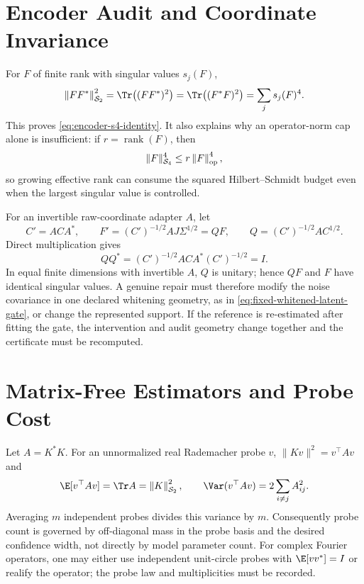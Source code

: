 \section{Encoder Audit and Coordinate Invariance}
\label{app:encoder-audit}

For $F$ of finite rank with singular values $s_j(F)$,
\begin{equation}
  \hsnorm{FF^\ast}^{2}
  =\Tr\bigl((FF^\ast)^2\bigr)
  =\Tr\bigl((F^\ast F)^2\bigr)
  =\sum_j s_j(F)^4.
\end{equation}
This proves \cref{eq:encoder-s4-identity}. It also explains why an
operator-norm cap alone is insufficient: if $r=\operatorname{rank}(F)$, then
\begin{equation}
  \lVert F\rVert_{\mathcal{S}_{4}}^4
  \le r\left\lVert F \right\rVert_{\mathrm{op}}^4,
\end{equation}
so growing effective rank can consume the squared Hilbert--Schmidt budget even
when the largest singular value is controlled.

For an invertible raw-coordinate adapter $A$, let
\begin{equation}
  C'=ACA^\ast,\qquad
  F'=(C')^{-1/2}AJ\Sigma^{1/2}
     =QF,\qquad
  Q=(C')^{-1/2}AC^{1/2}.
  \label{eq:encoder-coordinate-change}
\end{equation}
Direct multiplication gives
\begin{equation}
  QQ^\ast=(C')^{-1/2}ACA^\ast(C')^{-1/2}=I.
\end{equation}
In equal finite dimensions with invertible $A$, $Q$ is unitary; hence $QF$ and
$F$ have identical singular values. A genuine repair must therefore modify
the noise covariance in one declared whitening geometry, as in
\cref{eq:fixed-whitened-latent-gate}, or change the represented support. If
the reference is re-estimated after fitting the gate, the intervention and
audit geometry change together and the certificate must be recomputed.


\section{Matrix-Free Estimators and Probe Cost}
\label{app:estimators}

Let $A=K^\ast K$. For an unnormalized real Rademacher probe $v$,
$\lVert Kv\rVert^2=v^\top Av$ and
\begin{equation}
  \E[v^\top Av]=\Tr A=\hsnorm{K}^2,
  \qquad
  \Var(v^\top Av)=2\sum_{i\ne j}A_{ij}^2.
  \label{eq:hutchinson-exact-variance}
\end{equation}
Averaging $m$ independent probes divides this variance by $m$. Consequently
probe count is governed by off-diagonal mass in the probe basis and the desired
confidence width, not directly by model parameter count. For complex Fourier
operators, one may either use independent unit-circle probes with
$\E[vv^\ast]=I$ or realify the operator; the probe law and multiplicities must
be recorded.

